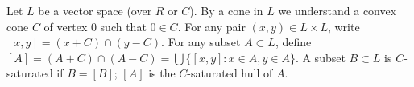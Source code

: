 Let $L$ be a vector space (over $R$ or $C$). By a cone in $L$ we understand a convex cone $C$ of vertex 0 such that $0 \in C$. For any pair $(x, y) \in L \times L$, write $[x, y] = (x + C) \cap (y - C)$. For any subset $A \subset L$, define $[A] = (A + C) \cap (A - C) = \bigcup \{[x, y]: x \in A, y \in A\}$. A subset $B \subset L$ is $C$-saturated if $B = [B]$; $[A]$ is the $C$-saturated hull of $A$.
